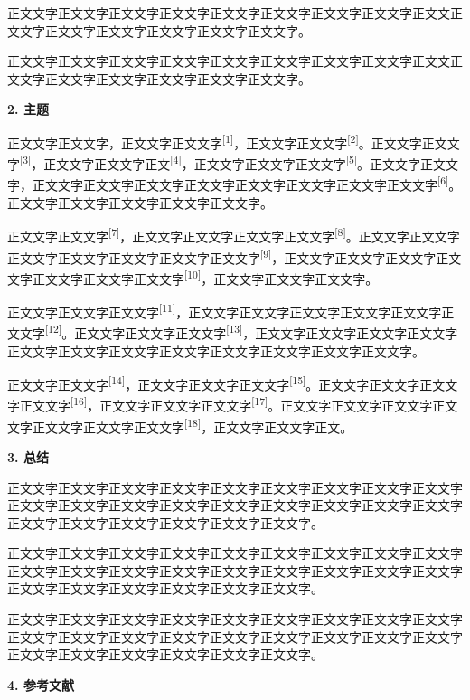 \documentclass[
]{article}
\begin{document}
正文文字正文文字正文文字正文文字正文文字正文文字正文文字正文文字正文文正文文字正文文字正文文字正文文字正文文字正文文字。

正文文字正文文字正文文字正文文字正文文字正文文字正文文字正文文字正文文正文文字正文文字正文文字正文文字正文文字正文文字。

\textbf{2. 主题}

正文文字正文文字，正文文字正文文字\textsuperscript{{[}1{]}}，正文文字正文文字\textsuperscript{{[}2{]}}。正文文字正文文字\textsuperscript{{[}3{]}}，正文文字正文文字正文\textsuperscript{{[}4{]}}，正文文字正文文字正文文字\textsuperscript{{[}5{]}}。正文文字正文文字，正文文字正文文字正文文字正文文字正文文字正文文字正文文字正文文字\textsuperscript{{[}6{]}}。正文文字正文文字正文文字正文文字正文文字。

正文文字正文文字\textsuperscript{{[}7{]}}，正文文字正文文字正文文字正文文字\textsuperscript{{[}8{]}}。正文文字正文文字正文文字正文文字正文文字正文文字正文文字\textsuperscript{{[}9{]}}，正文文字正文文字正文文字正文文字正文文字正文文字正文文字\textsuperscript{{[}10{]}}，正文文字正文文字正文文字。

正文文字正文文字正文文字\textsuperscript{{[}11{]}}，正文文字正文文字正文文字正文文字正文文字正文文字\textsuperscript{{[}12{]}}。正文文字正文文字正文文字\textsuperscript{{[}13{]}}，正文文字正文文字正文文字正文文字正文文字正文文字正文文字正文文字正文文字正文文字正文文字正文文字。

正文文字正文文字\textsuperscript{{[}14{]}}，正文文字正文文字正文文字\textsuperscript{{[}15{]}}。正文文字正文文字正文文字正文文字\textsuperscript{{[}16{]}}，正文文字正文文字正文文字\textsuperscript{{[}17{]}}。正文文字正文文字正文文字正文文字正文文字正文文字正文文字\textsuperscript{{[}18{]}}，正文文字正文文字正文。

\textbf{3. 总结}

正文文字正文文字正文文字正文文字正文文字正文文字正文文字正文文字正文文字正文文字正文文字正文文字正文文字正文文字正文文字正文文字正文文字正文文字正文文字正文文字正文文字正文文字正文文字正文文字。

正文文字正文文字正文文字正文文字正文文字正文文字正文文字正文文字正文文字正文文字正文文字正文文字正文文字正文文字正文文字正文文字正文文字正文文字正文文字正文文字正文文字正文文字正文文字正文文字。

正文文字正文文字正文文字正文文字正文文字正文文字正文文字正文文字正文文字正文文字正文文字正文文字正文文字正文文字正文文字正文文字正文文字正文文字正文文字正文文字正文文字正文文字正文文字正文文字。

\textbf{4. 参考文献}
\end{document}
